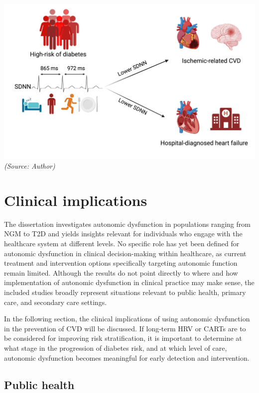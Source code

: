 \documentclass[
  a4paper,
  headsepline=true,
  open=left]{scrbook}
\begin{document}
\includegraphics{images/ADD_PRO_IMG.png} \emph{(Source: Author)}

\hypertarget{clinical-implications}{%
\section{Clinical implications}\label{clinical-implications}}

The dissertation investigates autonomic dysfunction in populations
ranging from NGM to T2D and yields insights relevant for individuals who
engage with the healthcare system at different levels. No specific role
has yet been defined for autonomic dysfunction in clinical
decision-making within healthcare, as current treatment and intervention
options specifically targeting autonomic function remain limited.
Although the results do not point directly to where and how
implementation of autonomic dysfunction in clinical practice may make
sense, the included studies broadly represent situations relevant to
public health, primary care, and secondary care settings.

In the following section, the clinical implications of using autonomic
dysfunction in the prevention of CVD will be discussed. If long-term HRV
or CARTs are to be considered for improving risk stratification, it is
important to determine at what stage in the progression of diabetes
risk, and at which level of care, autonomic dysfunction becomes
meaningful for early detection and intervention.

\hypertarget{public-health}{%
\subsection{Public health}\label{public-health}}
\end{document}

